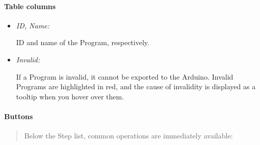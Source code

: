 \hypertarget{table-columns-1}{%
\paragraph{Table columns}\label{table-columns-1}}

\begin{itemize}
\item
  \emph{ID, Name:}

  ID and name of the Program, respectively.
\item
  \emph{Invalid:}

  If a Program is invalid, it cannot be exported to the Arduino. Invalid
  Programs are highlighted in red, and the cause of invalidity is
  displayed as a tooltip when you hover over them.
\end{itemize}

\hypertarget{buttons-1}{%
\paragraph{Buttons}\label{buttons-1}}

\begin{quote}
Below the Step list, common operations are immediately available:
\end{quote}

